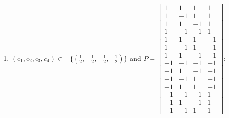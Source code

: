 \begin{enumerate}
\item[(e14)\,\newitem] $(c_1,c_2,c_3,c_4)\in \pm\{(\tfrac{1}{2},-\tfrac{1}{2},-\tfrac{1}{2},-\tfrac{1}{2})\}$ and $P=\begin{bmatrix}1&1&1&1\\1&-1&1&1\\1&1&-1&1\\1&-1&-1&1\\1&1&1&-1\\1&-1&1&-1\\1&1&-1&-1\\-1&-1&-1&-1\\-1&1&-1&-1\\-1&-1&1&-1\\-1&1&1&-1\\-1&-1&-1&1\\-1&1&-1&1\\-1&-1&1&1\end{bmatrix}$;
\end{enumerate}
